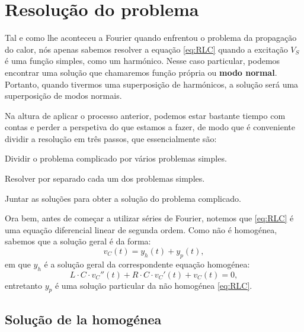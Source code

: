 \section{Resolução do problema}
Tal e como lhe aconteceu a Fourier quando enfrentou o problema da
propagação do calor, nós apenas sabemos resolver a equação
\eqref{eq:RLC} quando a excitação $V_S$ é uma função simples, como um
harmónico. Nesse caso particular, podemos encontrar uma solução que
chamaremos função própria ou \textbf{modo normal}. Portanto, quando
tivermos uma superposição de harmónicos, a solução será uma
superposição de modos normais.

Na altura de aplicar o processo anterior, podemos estar bastante
tiempo com contas e perder a perspetiva do que estamos a fazer, de
modo que é conveniente dividir a resolução em três passos, que
essencialmente são:
\begin{mybox}
  \begin{enumerate}[{\bfseries [R1]}]
  \item Dividir o problema complicado por vários problemas simples.
  \item Resolver por separado cada um dos problemas simples.
  \item Juntar as soluções para obter a solução do problema complicado.
\end{enumerate}
\end{mybox}

Ora bem, antes de começar a utilizar séries de Fourier, notemos que
\eqref{eq:RLC} é uma equação diferencial linear de segunda ordem. Como
não é homogénea, sabemos que a solução geral é da forma:
\[
v_C(t) = y_h(t) + y_p(t),
\]
em que $y_h$ é a solução geral da correspondente equação homogénea:
\begin{equation}
  \label{eq:HomogeneaRLC}
  L\cdot C \cdot v_C '' (t) + R\cdot C\cdot v_C'(t) + v_C(t) = 0,
\end{equation}
 entretanto $y_p$ é uma solução particular da não homogénea \eqref{eq:RLC}.

\subsection{Solução de la homogénea} \label{solucionHomogenea} 

